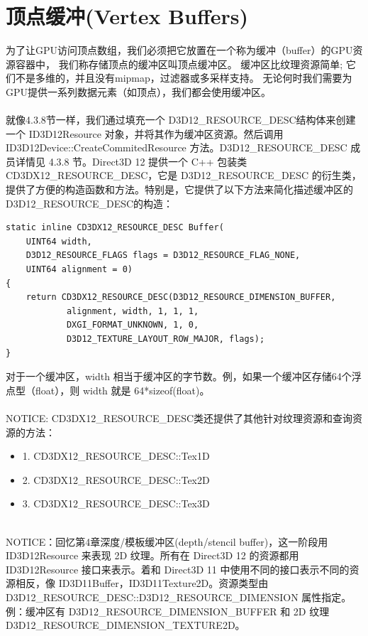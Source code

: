 \documentclass[11pt,a4paper,oldfontcommands]{memoir}
\begin{document}
{\section{顶点缓冲(Vertex Buffers)}
\begin{flushleft}
为了让GPU访问顶点数组，我们必须把它放置在一个称为缓冲（buffer）的GPU资源容器中， 我们称存储顶点的缓冲区叫顶点缓冲区。 缓冲区比纹理资源简单; 它们不是多维的，并且没有mipmap，过滤器或多采样支持。 无论何时我们需要为GPU提供一系列数据元素（如顶点），我们都会使用缓冲区。\\
~\\
就像4.3.8节一样，我们通过填充一个 D3D12\_RESOURCE\_DESC结构体来创建一个 ID3D12Resource 对象，并将其作为缓冲区资源。然后调用 ID3D12Device::CreateCommitedResource 方法。D3D12\_RESOURCE\_DESC 成员详情见 4.3.8 节。Direct3D 12 提供一个 C++ 包装类 CD3DX12\_RESOURCE\_DESC，它是 D3D12\_RESOURCE\_DESC 的衍生类，提供了方便的构造函数和方法。特别是，它提供了以下方法来简化描述缓冲区的D3D12\_RESOURCE\_DESC的构造：
\begin{lstlisting}
static inline CD3DX12_RESOURCE_DESC Buffer(
    UINT64 width, 
    D3D12_RESOURCE_FLAGS flags = D3D12_RESOURCE_FLAG_NONE,
    UINT64 alignment = 0)
{
    return CD3DX12_RESOURCE_DESC(D3D12_RESOURCE_DIMENSION_BUFFER, 
            alignment, width, 1, 1, 1, 
            DXGI_FORMAT_UNKNOWN, 1, 0,
            D3D12_TEXTURE_LAYOUT_ROW_MAJOR, flags);
}
\end{lstlisting}
对于一个缓冲区，width 相当于缓冲区的字节数。例，如果一个缓冲区存储64个浮点型（float），则 width 就是 64*sizeof(float)。\\
~\\
NOTICE: CD3DX12\_RESOURCE\_DESC类还提供了其他针对纹理资源和查询资源的方法：\\
\begin{itemize}
    \item 1. CD3DX12\_RESOURCE\_DESC::Tex1D
    \item 2. CD3DX12\_RESOURCE\_DESC::Tex2D
    \item 3. CD3DX12\_RESOURCE\_DESC::Tex3D
\end{itemize}
~\\
NOTICE：回忆第4章深度/模板缓冲区(depth/stencil buffer)，这一阶段用ID3D12Resource 来表现 2D 纹理。所有在 Direct3D 12 的资源都用 ID3D12Resource 接口来表示。着和 Direct3D 11 中使用不同的接口表示不同的资源相反，像 ID3D11Buffer，ID3D11Texture2D。资源类型由 D3D12\_RESOURCE\_DESC::D3D12\_RESOURCE\_DIMENSION 属性指定。例：缓冲区有 D3D12\_RESOURCE\_DIMENSION\_BUFFER 和 2D 纹理 D3D12\_RESOURCE\_DIMENSION\_TEXTURE2D。\\

\end{flushleft}}
\end{document}
